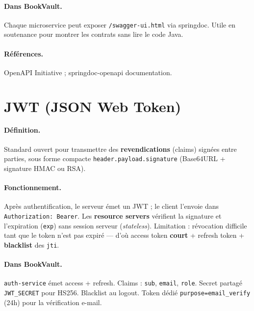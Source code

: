 \documentclass[12pt,a4paper]{report}
\begin{document}
\paragraph{Dans BookVault.} Chaque microservice peut exposer \texttt{/swagger-ui.html} via springdoc. Utile en soutenance pour montrer les contrats sans lire le code Java.\par

\paragraph{Références.} OpenAPI Initiative ; springdoc-openapi documentation.\par


\section{JWT (JSON Web Token)}

\paragraph{Définition.} Standard ouvert pour transmettre des \textbf{revendications} (claims) signées entre parties, sous forme compacte \texttt{header.payload.signature} (Base64URL + signature HMAC ou RSA).\par

\paragraph{Fonctionnement.} Après authentification, le serveur émet un JWT ; le client l'envoie dans \texttt{Authorization: Bearer}. Les \textbf{resource servers} vérifient la signature et l'expiration (\texttt{exp}) sans session serveur (\textit{stateless}). Limitation : révocation difficile tant que le token n'est pas expiré — d'où access token \textbf{court} + refresh token + \textbf{blacklist} des \texttt{jti}.\par

\paragraph{Dans BookVault.} \texttt{auth-service} émet access + refresh. Claims : \texttt{sub}, \texttt{email}, \texttt{role}. Secret partagé \texttt{JWT\_SECRET} pour HS256. Blacklist au logout. Token dédié \texttt{purpose=email\_verify} (24h) pour la vérification e-mail.\par
\end{document}
